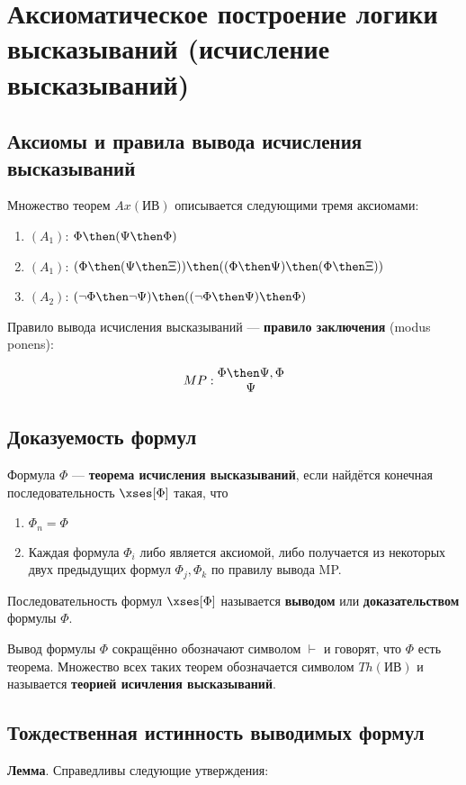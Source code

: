 \section{Аксиоматическое построение логики высказываний (исчисление высказываний)}
\subsection{Аксиомы и правила вывода исчисления высказываний}
Множество теорем $Ax(\text{ИВ})$ описывается следующими тремя аксиомами:

\begin{enumerate}
    \item $(A_1)$: $\Phi \then (\Psi \then \Phi)$
    \item $(A_1)$: $(\Phi \then (\Psi \then \Xi)) \then ((\Phi \then \Psi) \then (\Phi \then \Xi))$
    \item $(A_2)$: $(\lnot \Phi \then \lnot \Psi) \then ((\lnot \Phi \then \Psi) \then \Phi)$
\end{enumerate}

\dftion Правило вывода исчисления высказываний --- \textbf{правило заключения} (modus ponens):

$$
MP: \begin{matrix}
    \Phi \then \Psi, \Phi \\
    \Psi
\end{matrix}
$$
\subsection{Доказуемость формул}
\dftion Формула $\Phi$ --- \textbf{теорема исчисления высказываний}, если найдётся конечная последовательность $\xses[\Phi]$ такая, что

\begin{enumerate}
    \item $\Phi_n = \Phi$
    \item Каждая формула $\Phi_i$ либо является аксиомой, либо получается из некоторых двух предыдущих формул $\Phi_j, \Phi_k$ по правилу вывода MP.
\end{enumerate}

Последовательность формул $\xses[\Phi]$ называется \textbf{выводом} или \textbf{доказательством} формулы $\Phi$.

\dftion Вывод формулы $\Phi$ сокращённо обозначают символом $\vdash$ и говорят, что $\Phi$ есть теорема. Множество всех таких теорем обозначается символом $Th(\text{ИВ})$ и называется \textbf{теорией исичления высказываний}.
\subsection{Тождественная истинность выводимых формул}
\textbf{Лемма}. Справедливы следующие утверждения:

